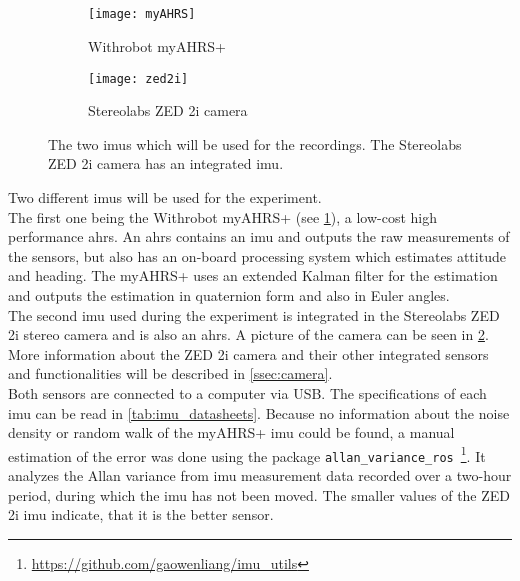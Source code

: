 \subsection{}
\begin{figure}[htb]
    \centering
    \begin{subfigure}[b]{0.4\textwidth}
        \centering
        \texttt{[image: myAHRS]}
        \caption{Withrobot myAHRS+ \cite{Withrobot2017}}
        \label{fig:imu_myahrs}
    \end{subfigure}
    \begin{subfigure}[b]{0.4\textwidth}
        \centering
        \texttt{[image: zed2i]}
        \caption{Stereolabs ZED 2i camera \cite{Stereolabs2019}}
        \label{fig:imu_zed}
    \end{subfigure}
    \caption[The  used in the experiment]{The two \glspl{imu} which will be used for the recordings. The Stereolabs ZED 2i camera has an integrated \gls{imu}.}
    \label{fig:imus_used}
\end{figure}
Two different \glspl{imu} will be used for the experiment.\\
The first one being the Withrobot myAHRS+ (see \cref{fig:imu_myahrs}), a low-cost high performance \gls{ahrs}.
An \gls{ahrs} contains an \gls{imu} and outputs the raw measurements of the sensors, but also has an on-board processing system which estimates attitude and heading.
The myAHRS+ uses an extended Kalman filter for the estimation and outputs the estimation in quaternion form and also in Euler angles.\\
The second \gls{imu} used during the experiment is integrated in the Stereolabs ZED 2i stereo camera and is also an \gls{ahrs}.
A picture of the camera can be seen in \cref{fig:imu_zed}.
More information about the ZED 2i camera and their other integrated sensors and functionalities will be described in \cref{ssec:camera}.\\
Both sensors are connected to a computer via USB.
The specifications of each \gls{imu} can be read in \cref{tab:imu_datasheets}.
Because no information about the noise density or random walk of the myAHRS+ \gls{imu} could be found, a manual estimation of the error was done using the package \texttt{allan\_variance\_ros}~\footnote{\url{https://github.com/gaowenliang/imu_utils}}.
It analyzes the Allan variance from \gls{imu} measurement data recorded over a two-hour period, during which the \gls{imu} has not been moved.
The smaller values of the ZED 2i \gls{imu} indicate, that it is the better sensor.
